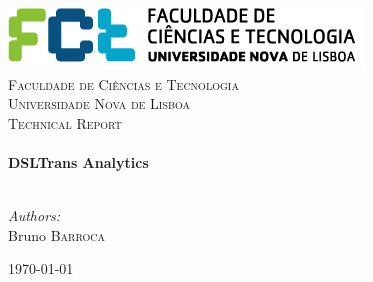\documentclass{article}
\begin{document}

\begin{titlepage}

\begin{center}


\includegraphics{images/logo.png}\\[1cm]

\textsc{\LARGE Faculdade de Ci\^{e}ncias e Tecnologia}\\[1.5cm]
\textsc{\LARGE Universidade Nova de Lisboa}\\[1.5cm]

\textsc{\Large Technical Report}\\[0.5cm]


\HRule \\[0.4cm]
{ \huge \bfseries DSLTrans Analytics}\\[0.4cm]

\HRule \\[1.5cm]

\begin{minipage}{0.4\textwidth}
\begin{flushleft} \large
\emph{Authors:}\\
Bruno \textsc{Barroca}
\end{flushleft}
\end{minipage}
\vfill

{\large \today}

\end{center}

\end{titlepage}


\clearpage
\end{document}
